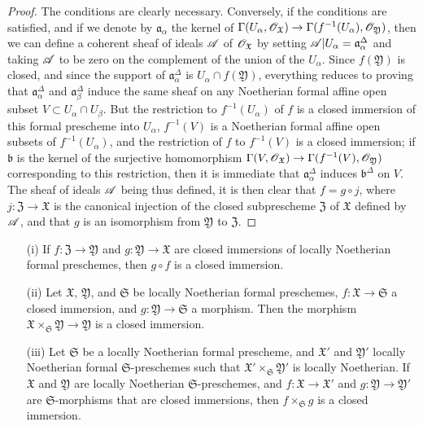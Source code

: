 \begin{proof}
The conditions are clearly necessary.
Conversely, if the conditions are satisfied, and if we denote by $\mathfrak{a}_\alpha$ the kernel of $\Gamma(U_\alpha,\sh{O}_\mathfrak{X})\to\Gamma(f^{-1}(U_\alpha),\sh{O}_\mathfrak{Y})$, then we can define a coherent sheaf of ideals $\mathscr{A}$ of $\mathscr{O}_\mathfrak{X}$ by setting $\mathscr{A}|U_\alpha=\mathfrak{a}_\alpha^\Delta$ and taking $\mathscr{A}$ to be zero on the complement of the union of the $U_\alpha$.
Since $f(\mathfrak{Y})$ is closed, and since the support of $\mathfrak{a}_\alpha^\Delta$ is $U_\alpha\cap f(\mathfrak{Y})$, everything reduces to proving that $\mathfrak{a}_\alpha^\Delta$ and $\mathfrak{a}_\beta^\Delta$ induce the same sheaf on any Noetherian formal affine open subset $V\subset U_\alpha\cap U_\beta$.
But the restriction to $f^{-1}(U_\alpha)$ of $f$ is a closed immersion of this formal prescheme into $U_\alpha$, $f^{-1}(V)$ is a Noetherian formal affine open subsets of $f^{-1}(U_\alpha)$, and the restriction of $f$ to $f^{-1}(V)$ is a closed immersion;
if $\mathfrak{b}$ is the kernel of the surjective homomorphism $\Gamma(V,\sh{O}_\mathfrak{X})\to\Gamma(f^{-1}(V),\sh{O}_\mathfrak{Y})$ corresponding to this restriction, then it is immediate  that $\mathfrak{a}_\alpha^\Delta$ induces $\mathfrak{b}^\Delta$ on $V$.
The sheaf of ideals $\mathscr{A}$ being thus defined, it is then clear that $f=g\circ j$, where $j:\mathfrak{Z}\to\mathfrak{X}$ is the canonical injection of the closed subprescheme $\mathfrak{Z}$ of $\mathfrak{X}$ defined by $\mathscr{A}$, and that $g$ is an isomorphism from $\mathfrak{Y}$ to $\mathfrak{Z}$.
\end{proof}

\begin{proposition}[10.14.5]
\label{I.10.14.5}
\medskip\noindent
\begin{enumerate}
  \item[\rm{(i)}] If $f:\mathfrak{Z}\to\mathfrak{Y}$ and $g:\mathfrak{Y}\to\mathfrak{X}$ are closed immersions of locally Noetherian formal preschemes, then $g\circ f$ is a closed immersion.
  \item[\rm{(ii)}] Let $\mathfrak{X}$, $\mathfrak{Y}$, and $\mathfrak{S}$ be locally Noetherian formal preschemes, $f:\mathfrak{X}\to\mathfrak{S}$ a closed immersion, and $g:\mathfrak{Y}\to\mathfrak{S}$ a morphism.
    Then the morphism $\mathfrak{X}\times_\mathfrak{S}\mathfrak{Y}\to\mathfrak{Y}$ is a closed immersion.
  \item[\rm{(iii)}] Let $\mathfrak{S}$ be a locally Noetherian formal prescheme, and $\mathfrak{X}'$ and $\mathfrak{Y}'$ locally Noetherian formal $\mathfrak{S}$-preschemes such that $\mathfrak{X}'\times_\mathfrak{S}\mathfrak{Y}'$ is locally Noetherian.
    If $\mathfrak{X}$ and $\mathfrak{Y}$ are locally Noetherian $\mathfrak{S}$-preschemes, and $f:\mathfrak{X}\to\mathfrak{X}'$ and $g:\mathfrak{Y}\to\mathfrak{Y}'$ are $\mathfrak{S}$-morphisms that are closed immersions, then $f\times_\mathfrak{S}g$ is a closed immersion.
\end{enumerate}
\end{proposition}

